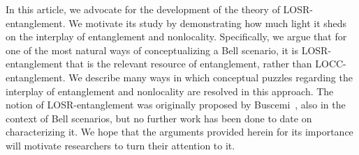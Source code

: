 \documentclass[prx,11pt,letterpaper,twocolumn,accepted=2023-11-27]{quantumarticle}
\theoremstyle{plain}
\theoremstyle{definition}
\begin{document}
In this article, we advocate for the development of the theory of LOSR-entanglement. 
 We motivate  its study by  demonstrating how much light it sheds on  the interplay of entanglement and nonlocality.  Specifically, we argue that for one of the most natural ways of conceptualizing a Bell scenario,
it is LOSR-entanglement that is the relevant resource of entanglement, rather than LOCC-entanglement.  We describe many ways in which conceptual puzzles regarding the interplay of entanglement and nonlocality are resolved in this approach.   
 The notion of LOSR-entanglement was originally proposed by Buscemi~\cite{Buscemi2012LOSR}, also in the context of Bell scenarios, but no further work has been done to date on characterizing it. We hope that the arguments provided herein for its importance  will motivate researchers to turn their attention to it.
\end{document}
